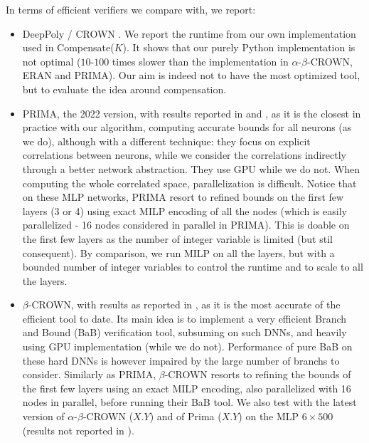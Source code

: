\documentclass{llncs}
\begin{document}
In terms of efficient verifiers we compare with, we report:
\begin{itemize}
	\item DeepPoly \cite{deeppoly}/ CROWN \cite{crown}. We report the runtime from our own implementation used in Compensate($K$). It shows that our purely Python implementation is not optimal ($10$-$100$ times slower than the implementation in $\alpha$-$\beta$-CROWN, ERAN and PRIMA). Our aim is indeed not to have the most optimized tool, but to evaluate the idea around compensation.
	\item PRIMA, the 2022 version, with results reported in \cite{prima} and \cite{crown}, as it is the closest in practice with our algorithm, computing accurate bounds for all neurons (as we do), although with a different technique: they focus on explicit correlations between neurons, while we consider the correlations indirectly through a better network abstraction. They use GPU while we do not. When computing the whole correlated space, 
	parallelization is difficult.
	Notice that on these MLP networks, PRIMA resort to refined bounds on the first few layers (3 or 4) using exact MILP encoding of all the nodes (which is easily parallelized - 16 nodes considered in parallel in PRIMA). This is doable on the first few layers as the number of integer variable is limited (but stil consequent). By comparison, we run MILP on all the layers, but with a bounded number of integer variables to control the runtime and to scale to all the layers.
	\item $\beta$-CROWN, with results as reported in \cite{crown}, as it is the most accurate of the efficient tool to date. Its main idea is to implement a very efficient Branch and Bound (BaB) verification tool, subsuming \cite{BaB} on such DNNs, and heavily using GPU implementation (while we do not). Performance of pure BaB on these hard DNNs is however impaired by the large number of branchs to consider. Similarly as PRIMA, $\beta$-CROWN resorts to refining the bounds of the first few layers using an exact MILP encoding, also parallelized with 16 nodes in parallel, before running their BaB tool. We also test with the latest version of $\alpha$-$\beta$-CROWN ($X.Y$)
	and of Prima ($X.Y$) on the MLP $6 \times 500$ (results not reported in \cite{crown,prima}).




\end{itemize}
\end{document}
